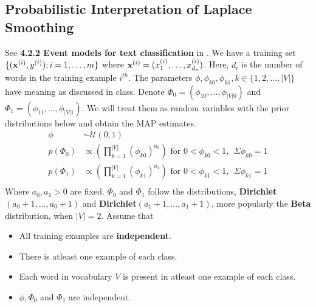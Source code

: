 \subsection{Probabilistic Interpretation of Laplace Smoothing}
See \textbf{4.2.2 Event models for text classification} in \cite{ng2023cs229}. 
We have a training set $\{(\mathbf{x}^{(i)}, y^{(i)}); i = 1, \dots , m \}$ where $\mathbf{x}^{(i)} = (x^{(i)}_1, \dots , x^{(i)}_{d_n})$. Here, $d_i$ is the number of words in the training example $i^{th}$. The parameters $\phi, \phi_{k0}, \phi_{k1}, k \in \{1, 2,\dots,|V|\}$ have meaning as discussed in class. Denote $\Phi_0 = (\phi_{10},\dots, \phi_{|V|0})$ and $\Phi_1 = (\phi_{11},\dots, \phi_{|V|1})$. We will treat them as random variables with the prior distributions below and obtain the MAP estimates.
\begin{align*}
    \phi &\sim \mathcal{U}(0, 1)\\
    p(\Phi_0) &\propto \left(\prod_{k = 1}^{|V|}(\phi_{k0})^{a_0}\right) \text{ for }0 < \phi_{k0} < 1, \ \ \Sigma \phi_{k0} = 1\\
    p(\Phi_1) &\propto \left(\prod_{k = 1}^{|V|}(\phi_{k1})^{a_1}\right) \text{ for }0 < \phi_{k1} < 1, \ \ \Sigma \phi_{k1} = 1\\
\end{align*}
Where $a_0, a_1 > 0$ are fixed. $\Phi_0$ and $\Phi_1$ follow the distributions, \textbf{Dirichlet}$(a_0 + 1, \dots, a_0 + 1)$ and \textbf{Dirichlet}$(a_1 + 1, \dots, a_1 + 1)$, more popularly the \textbf{Beta} distribution, when $|V| = 2$. Assume that
\begin{itemize}
\item 
All training examples are \textbf{independent}.
\item
There is atleast one example of each class.
\item
Each word in vocabulary $V$ is present in atleast one example of each class.
\item $\phi, \Phi_0$ and $\Phi_1$ are independent.
\end{itemize}


